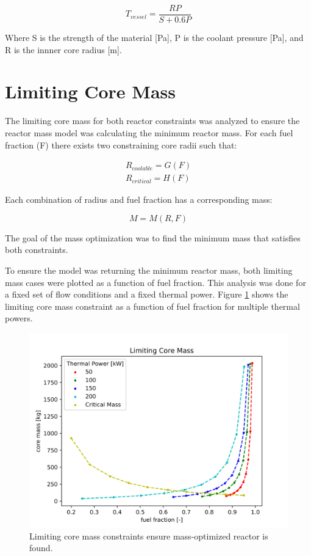 \begin{equation}
    T_{vessel} = \frac{RP}{S + 0.6P}
    \label{eq:pv_thick}
\end{equation}

Where S is the strength of the material [Pa], P is the coolant pressure [Pa],
and R is the innner core radius [m].

\section{Limiting Core Mass}
The limiting core mass for both reactor constraints was analyzed to ensure the
reactor mass model was calculating the minimum reactor mass. For each fuel
fraction (F) there exists two constraining core radii such that:

\begin{align}
    R_{coolable} = G(F) \\
    R_{critical} = H(F)
\end{align}

Each combination of radius and fuel fraction has a corresponding mass:

\begin{equation}
    M = M(R, F)
\end{equation}

The goal of the mass optimization was to find the minimum mass that satisfies
both constraints.

To ensure the model was returning the minimum reactor mass, both limiting mass
cases were plotted as a function of fuel fraction. This analysis was done for a
fixed set of flow conditions and a fixed thermal power. Figure
\ref{fig:limiting_core_mass} shows the limiting core mass constraint as a
function of fuel fraction for multiple thermal powers.

\begin{figure}[h]
    \centering
    \includegraphics[width=5in]{../images/limiting_core_mass.png}
\caption{Limiting core mass constraints ensure mass-optimized reactor is found.}
\label{fig:limiting_core_mass}
\end{figure}

